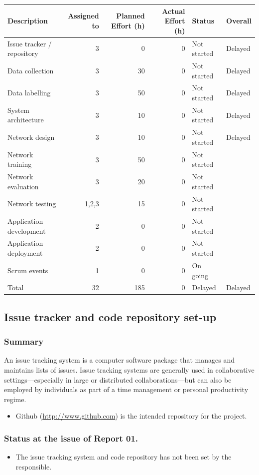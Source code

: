 \documentclass{article}
\begin{document}
\begin{enumerate}
\begin{center}
\begin{tabular}{lrrrll}
Description & Assigned to & Planned Effort (h) & Actual Effort (h) & Status & Overall\\
\hline
Issue tracker / repository & 3 & 0 & 0 & Not started & Delayed\\
Data collection & 3 & 30 & 0 & Not started & Delayed\\
Data labelling & 3 & 50 & 0 & Not started & Delayed\\
System architecture & 3 & 10 & 0 & Not started & Delayed\\
Network design & 3 & 10 & 0 & Not started & Delayed\\
Network training & 3 & 50 & 0 & Not started & \\
Network evaluation & 3 & 20 & 0 & Not started & \\
Network testing & 1,2,3 & 15 & 0 & Not started & \\
Application development & 2 & 0 & 0 & Not started & \\
Application deployment & 2 & 0 & 0 & Not started & \\
Scrum events & 1 & 0 & 0 & On going & \\
\hline
Total & 32 & 185 & 0 & Delayed & Delayed\\
\end{tabular}
\end{center}

\subsection{Issue tracker and code repository set-up}
\label{sec:orgaa653dc}
\subsubsection{Summary}
\label{sec:org7f31186}
An issue tracking system is a computer software package that manages and maintains lists of issues.
Issue tracking systems are generally used in collaborative settings—especially in large or distributed collaborations—but can also be employed by individuals as part of a time management or personal productivity regime.

\begin{itemize}
\item Github (\url{http://www.github.com}) is the intended repository for the project.
\end{itemize}
\subsubsection{Status at the issue of Report 01.}
\label{sec:orgd87f46a}
\begin{itemize}
\item The issue tracking system and code repository has not been set by the responsible.
\end{itemize}


\end{enumerate}
\end{document}
